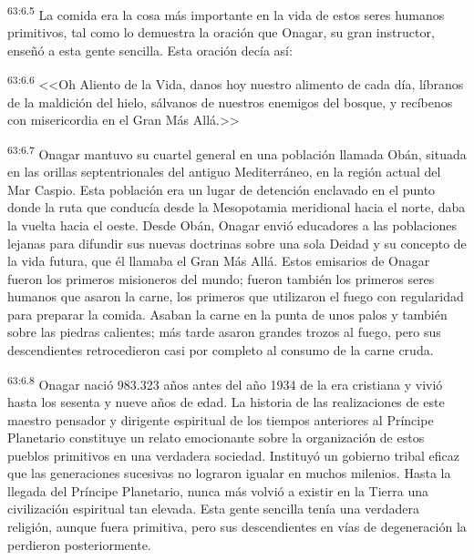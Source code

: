 \par
\textsuperscript{63:6.5} La comida era la cosa más importante en la vida de estos seres humanos primitivos, tal como lo demuestra la oración que Onagar, su gran instructor, enseñó a esta gente sencilla. Esta oración decía así:

\par
\textsuperscript{63:6.6} <<Oh Aliento de la Vida, danos hoy nuestro alimento de cada día, líbranos de la maldición del hielo, sálvanos de nuestros enemigos del bosque, y recíbenos con misericordia en el Gran Más Allá.>>

\par
\textsuperscript{63:6.7} Onagar mantuvo su cuartel general en una población llamada Obán, situada en las orillas septentrionales del antiguo Mediterráneo, en la región actual del Mar Caspio. Esta población era un lugar de detención enclavado en el punto donde la ruta que conducía desde la Mesopotamia meridional hacia el norte, daba la vuelta hacia el oeste. Desde Obán, Onagar envió educadores a las poblaciones lejanas para difundir sus nuevas doctrinas sobre una sola Deidad y su concepto de la vida futura, que él llamaba el Gran Más Allá. Estos emisarios de Onagar fueron los primeros misioneros del mundo; fueron también los primeros seres humanos que asaron la carne, los primeros que utilizaron el fuego con regularidad para preparar la comida. Asaban la carne en la punta de unos palos y también sobre las piedras calientes; más tarde asaron grandes trozos al fuego, pero sus descendientes retrocedieron casi por completo al consumo de la carne cruda.

\par
\textsuperscript{63:6.8} Onagar nació 983.323 años antes del año 1934 de la era cristiana y vivió hasta los sesenta y nueve años de edad. La historia de las realizaciones de este maestro pensador y dirigente espiritual de los tiempos anteriores al Príncipe Planetario constituye un relato emocionante sobre la organización de estos pueblos primitivos en una verdadera sociedad. Instituyó un gobierno tribal eficaz que las generaciones sucesivas no lograron igualar en muchos milenios. Hasta la llegada del Príncipe Planetario, nunca más volvió a existir en la Tierra una civilización espiritual tan elevada. Esta gente sencilla tenía una verdadera religión, aunque fuera primitiva, pero sus descendientes en vías de degeneración la perdieron posteriormente.

